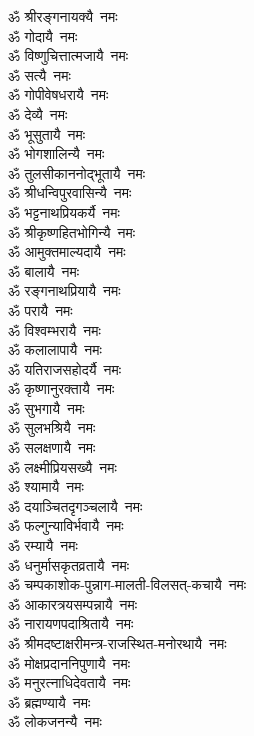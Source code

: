 \begin{multicols}{2}
\begin{flushleft}
ॐ श्रीरङ्गनायक्यै~नमः\\
ॐ गोदायै~नमः\\
ॐ विष्णुचित्तात्मजायै~नमः\\
ॐ सत्यै~नमः\\
ॐ गोपीवेषधरायै~नमः\\
ॐ देव्यै~नमः\\
ॐ भूसुतायै~नमः\\
ॐ भोगशालिन्यै~नमः\\
ॐ तुलसीकाननोद्भूतायै~नमः\\
ॐ श्रीधन्विपुरवासिन्यै~नमः\hfill{}\\
ॐ भट्टनाथप्रियकर्यै~नमः\\
ॐ श्रीकृष्णहितभोगिन्यै~नमः\\
ॐ आमुक्तमाल्यदायै~नमः\\
ॐ बालायै~नमः\\
ॐ रङ्गनाथप्रियायै~नमः\\
ॐ परायै~नमः\\
ॐ विश्वम्भरायै~नमः\\
ॐ कलालापायै~नमः\\
ॐ यतिराजसहोदर्यै~नमः\\
ॐ कृष्णानुरक्तायै~नमः\hfill{}\\
ॐ सुभगायै~नमः\\
ॐ सुलभश्रियै~नमः\\
ॐ सलक्षणायै~नमः\\
ॐ लक्ष्मीप्रियसख्यै~नमः\\
ॐ श्यामायै~नमः\\
ॐ दयाञ्चितदृगञ्चलायै~नमः\\
ॐ फल्गुन्याविर्भवायै~नमः\\
ॐ रम्यायै~नमः\\
ॐ धनुर्मासकृतव्रतायै~नमः\\
ॐ चम्पकाशोक-पुन्नाग-मालती-विलसत्-कचायै~नमः\hfill{}\\
ॐ आकारत्रयसम्पन्नायै~नमः\\
ॐ नारायणपदाश्रितायै~नमः\\
ॐ श्रीमदष्टाक्षरीमन्त्र-राजस्थित-मनोरथायै~नमः\\
ॐ मोक्षप्रदाननिपुणायै~नमः\\
ॐ मनुरत्नाधिदेवतायै~नमः\\
ॐ ब्रह्मण्यायै~नमः\\
ॐ लोकजनन्यै~नमः\\

\end{flushleft}
\end{multicols}
